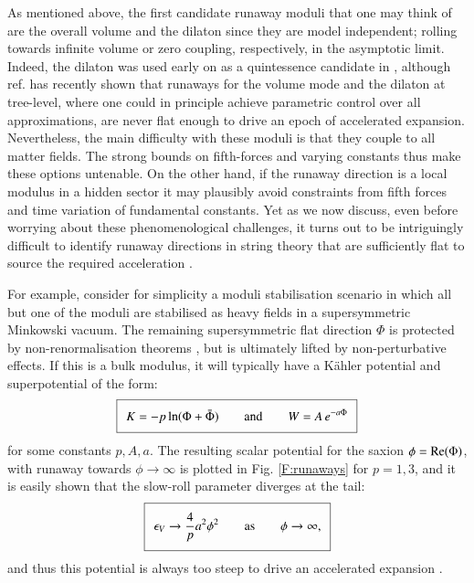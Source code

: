 As mentioned above, the first candidate runaway moduli that one may think of are the overall volume and the dilaton since they are model independent; rolling towards infinite volume or zero coupling, respectively, in the asymptotic limit. Indeed, the dilaton was used early on as a quintessence candidate in \cite{Gasperini:2001pc,Damour:2002mi}, although ref. \cite{Cicoli:2021fsd} has recently shown that runaways for the volume mode and the dilaton at tree-level, where one could in principle achieve parametric control over all approximations, are never flat enough to drive an epoch of accelerated expansion. Nevertheless, the main difficulty with these moduli is that they couple to all matter fields. The strong bounds on fifth-forces and varying constants thus make these options untenable. On the other hand, if the runaway direction is a local modulus in a hidden sector it may plausibly avoid constraints from fifth forces and time variation of fundamental constants. Yet as we now discuss, even before worrying about these phenomenological challenges, it turns out to be intriguingly difficult to identify runaway directions in string theory that are sufficiently flat to source the required acceleration \cite{Olguin-Tejo:2018pfq,Bento:2020fxj}.  

For example, consider for simplicity a moduli stabilisation scenario in which all but one of the moduli are stabilised as heavy fields in a supersymmetric Minkowski vacuum. The remaining supersymmetric flat direction $\Phi$ is protected by non-renormalisation theorems \cite{Dine:1986vd}, but is ultimately lifted by non-perturbative effects. If this is a bulk modulus, it will typically have a K\"ahler potential and superpotential of the form:
\begin{equation}
\setlength\fboxsep{0.25cm}
\setlength\fboxrule{0.4pt}
\boxed{
K = -p\ln(\Phi + \bar{\Phi}) \qquad\textrm{and}\qquad W = A\, e^{-a\Phi} 
\label{E:DSrunaway}
}
\end{equation}
for some constants $p, A, a$. The resulting scalar potential for the saxion $\phi = {\rm Re}(\Phi)$, with runaway towards $\phi \rightarrow \infty$ is plotted in Fig. \ref{F:runaways} for $p=1,3$, and it is easily shown that the slow-roll parameter diverges at the tail:
\begin{equation}
\setlength\fboxsep{0.25cm}
\setlength\fboxrule{0.4pt}
\boxed{
\epsilon_V \rightarrow \frac{4}{p} a^2 \phi^2 \qquad\text{as}\qquad \phi \rightarrow \infty,
}
\end{equation}
and thus this potential is always too steep to drive an accelerated expansion \cite{Olguin-Tejo:2018pfq}.  

